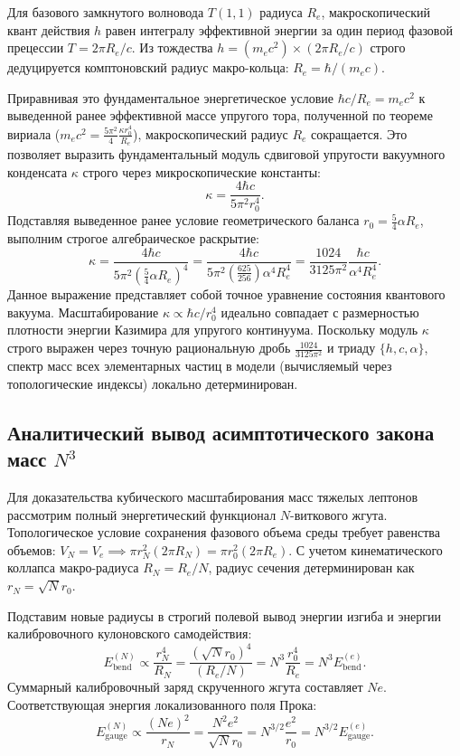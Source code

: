 \documentclass[11pt,a4paper]{article}
\begin{document}
	Для базового замкнутого волновода $T(1,1)$ радиуса $R_e$, макроскопический квант действия $h$ равен интегралу эффективной энергии за один период фазовой прецессии $T = 2\pi R_e/c$. Из тождества $h = (m_e c^2) \times (2\pi R_e/c)$ строго дедуцируется комптоновский радиус макро-кольца: $R_e = \hbar / (m_e c)$. 
	
	Приравнивая это фундаментальное энергетическое условие $\hbar c / R_e = m_e c^2$ к выведенной ранее эффективной массе упругого тора, полученной по теореме вириала ($m_e c^2 = \frac{5\pi^2}{4} \frac{\kappa r_0^4}{R_e}$), макроскопический радиус $R_e$ сокращается. Это позволяет выразить фундаментальный модуль сдвиговой упругости вакуумного конденсата $\kappa$ строго через микроскопические константы:
	\begin{equation}
		\kappa = \frac{4 \hbar c}{5\pi^2 r_0^4}.
	\end{equation}
	Подставляя выведенное ранее условие геометрического баланса $r_0 = \frac{5}{4}\alpha R_e$, выполним строгое алгебраическое раскрытие:
	\begin{equation}
		\kappa = \frac{4 \hbar c}{5\pi^2 \left( \frac{5}{4}\alpha R_e \right)^4} = \frac{4 \hbar c}{5\pi^2 \left( \frac{625}{256} \right) \alpha^4 R_e^4} = \frac{1024}{3125 \pi^2} \frac{\hbar c}{\alpha^4 R_e^4}.
	\end{equation}
	Данное выражение представляет собой точное уравнение состояния квантового вакуума. Масштабирование $\kappa \propto \hbar c / r_0^4$ идеально совпадает с размерностью плотности энергии Казимира для упругого континуума. 
	Поскольку модуль $\kappa$ строго выражен через точную рациональную дробь $\frac{1024}{3125\pi^2}$ и триаду $\{h, c, \alpha\}$, спектр масс всех элементарных частиц в модели (вычисляемый через топологические индексы) локально детерминирован.
	
	\subsection{Аналитический вывод асимптотического закона масс $N^3$}
	Для доказательства кубического масштабирования масс тяжелых лептонов рассмотрим полный энергетический функционал $N$-виткового жгута. Топологическое условие сохранения фазового объема среды требует равенства объемов: $V_N = V_e \implies \pi r_N^2 (2\pi R_N) = \pi r_0^2 (2\pi R_e)$. С учетом кинематического коллапса макро-радиуса $R_N = R_e / N$, радиус сечения детерминирован как $r_N = \sqrt{N} r_0$.
	
	Подставим новые радиусы в строгий полевой вывод энергии изгиба и энергии калибровочного кулоновского самодействия:
	\begin{equation}
		E_{\text{bend}}^{(N)} \propto \frac{r_N^4}{R_N} = \frac{(\sqrt{N} r_0)^4}{(R_e / N)} = N^3 \frac{r_0^4}{R_e} = N^3 E_{\text{bend}}^{(e)}.
	\end{equation}
	Суммарный калибровочный заряд скрученного жгута составляет $N e$. Соответствующая энергия локализованного поля Прока:
	\begin{equation}
		E_{\text{gauge}}^{(N)} \propto \frac{(Ne)^2}{r_N} = \frac{N^2 e^2}{\sqrt{N} r_0} = N^{3/2} \frac{e^2}{r_0} = N^{3/2} E_{\text{gauge}}^{(e)}.
	\end{equation}
	
\end{document}
